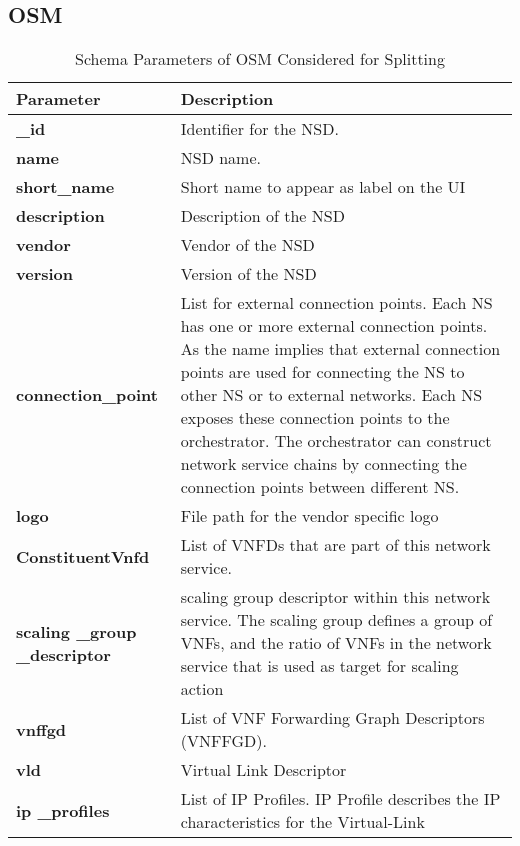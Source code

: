 \subsection{OSM}
\begin{table}[H] \cite{OSMSchemaDocumentation}
	\begin{center}
		\caption{Schema Parameters of OSM Considered for Splitting}
		\label{tab:table2}
		\begin{tabular}{l|l} 
			\textbf{Parameter} & \textbf{Description} \\
			\hline
			\textbf{\_id} & Identifier for the NSD. \\ 
			\textbf{name} & NSD name. \\
			\textbf{short\_name} & Short name to appear as label on the UI \\
			\textbf{description} & Description of the NSD \\
			\textbf{vendor} & Vendor of the NSD \\
			\textbf{version} & Version of the NSD \\
			\textbf{connection\_point} & List for external connection points.
Each NS has one or more external connection
points. As the name implies that external
connection points are used for connecting
the NS to other NS or to external networks.
Each NS exposes these connection points to
the orchestrator. The orchestrator can
construct network service chains by
connecting the connection points between
different NS. \\
			\textbf{logo} & File path for the vendor specific logo \\
			\textbf{ConstituentVnfd} & List of VNFDs that are part of this
network service. \\
			\textbf{scaling \_group \_descriptor} & scaling group descriptor within this network service.
The scaling group defines a group of VNFs,
and the ratio of VNFs in the network service
that is used as target for scaling action \\
			\textbf{vnffgd} & List of VNF Forwarding Graph Descriptors (VNFFGD). \\
			\textbf{vld} & Virtual Link Descriptor \\
			\textbf{ip \_profiles} & List of IP Profiles.
  IP Profile describes the IP characteristics for the Virtual-Link \\
		\end{tabular}
	\end{center}
\end{table}
